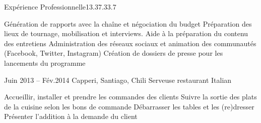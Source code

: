 \documentclass[30pt, french]{tccv}
\begin{document}
\begin{upshape}
\begin{flat_frame}{Expérience Professionnelle}{13.3}{7.3}{3.7}{}
\begin{eventlist}
    
\begin{itemize}
      \cvitem[\checkmark] Génération de rapports avec la chaîne et négociation du budget                   
      \cvitem[\checkmark] Préparation des lieux de tournage, mobilisation et interviews. Aide à la préparation du contenu des entretiens   
      \cvitem[\checkmark] Administration des réseaux sociaux et animation des communautés (Facebook, Twitter, Instagram)                                                                    
      \cvitem[\checkmark] Création de dossiers de presse pour les lancements du programme      
\end{itemize}      
  


\setlength{\parskip}{0pt}
\item{\color{text} Juin 2013 -- Fév.2014}
     {Capperi, Santiago, Chili}
     {Serveuse restaurant Italian}
     \fontsize{9pt}{1em}\color{text}\bodyfontlight\upshape\selectfont

    \begin{itemize}
      \cvitem[\checkmark] Accueillir, installer et prendre les commandes des clients
      \cvitem[\checkmark] Suivre la sortie des plats de la cuisine selon les bons de commande
      \cvitem[\checkmark] Débarrasser les tables et les (re)dresser
      \cvitem[\checkmark] Présenter l’addition à la demande du client
      
    \end{itemize}       
  
  
\end{eventlist}
\end{flat_frame}








\end{upshape}
\end{document}
